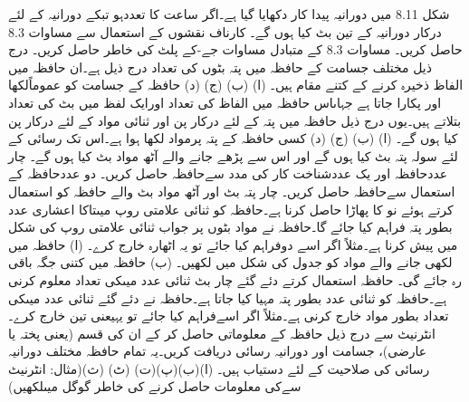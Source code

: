  شکل 8.11 میں دورانیہ پیدا کار دکھایا گیا ہے۔اگر ساعت کا تعددہو تبکے دورانیہ کے لئے درکار دورانیہ کے تین بٹ کیا ہوں گے۔
 کارناف نقشوں کے استعمال سے مساوات 8.3 حاصل کریں۔
 مساوات 8.3 کے متبادل مساوات جے-کے پلٹ کی خاطر حاصل کریں۔ 
 درج ذیل مختلف جسامت کے حافظہ میں پتہ بٹوں کی تعداد درج ذیل ہے۔ان حافظہ میں الفاظ ذخیرہ کرنے کے کتنے مقام ہیں۔ (ا) (ب) (ج) (د)
 حافظہ کے جسامت کو عموماًلکھا اور پکارا جاتا ہے جہاںاس حافظہ میں الفاظ کی تعداد اورایک لفظ میں بٹ کی تعداد بتلاتے ہیں۔یوں درج ذیل حافظہ میں پتہ کے لئے درکار پن اور ثنائی مواد کے لئے درکار پن کیا ہوں گے۔ (ا) (ب) (ج) (د)
 کسی حافظہ کے پتہ پرمواد لکھا ہوا ہے۔اس تک رسائی کے لئے سولہ پتہ بٹ کیا ہوں گے اور اس سے پڑھے جانے والے آٹھ مواد بٹ کیا ہوں گے۔
 چار عددحافظہ اور یک عددشناخت کار کی مدد سےحافظہ حاصل کریں۔
 دو عددحافظہ کے استعمال سےحافظہ حاصل کریں۔
 چار پتہ بٹ اور آٹھ مواد بٹ والے حافظہ کو استعمال کرتے ہوئے نو کا پھاڑا حاصل کرنا ہے۔حافظہ کو ثنائی علامتی روپ میںتاکا اعشاری عدد بطور پتہ فراہم کیا جائے گا۔حافظہ نے مواد بٹوں پر جواب ثنائی علامتی روپ کی شکل میں پیش کرنا ہے۔مثلاً اگر اسے دوفراہم کیا جائے تو یہ اٹھارہ خارج کرے۔ (ا) حافظہ میں لکھی جانے والے مواد کو جدول کی شکل میں لکھیں۔ (ب) حافظہ میں کتنی جگہ باقی رہ جائے گی۔ 
 حافظہ استعمال کرتے دئے گئے چار بٹ ثنائی عدد میںکی تعداد معلوم کرنی ہے۔حافظہ کو ثنائی عدد بطور پتہ مہیا کیا جاتا ہے۔حافظہ نے دئے گئے ثنائی عدد میںکی تعداد بطور مواد خارج کرنی ہے۔مثلاً اگر اسےفراہم کیا جائے تو یہیعنی تین خارج کرے۔
 انٹرنیٹ سے درج ذیل حافظہ کے معلوماتی حاصل کر کے ان کی قسم (یعنی پختہ یا عارضی)، جسامت اور دورانیہ رسائی دریافت کریں۔یہ تمام حافظہ مختلف دورانیہ رسائی کی صلاحیت کے لئے دستیاب ہیں۔ (ا)(ب)(پ)(ت) (ٹ) (ث)(مثال: انٹرنیٹ سےکی معلومات حاصل کرنے کی خاطر گوگل میںلکھیں)
